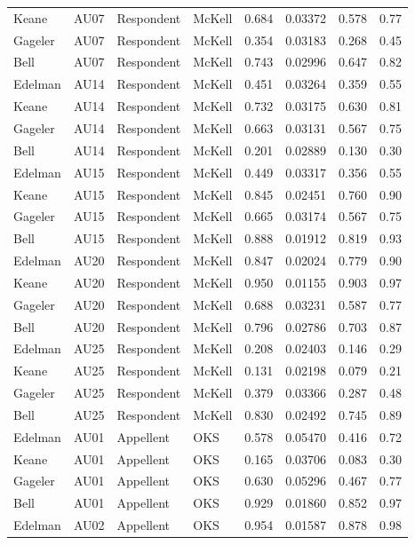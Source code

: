 \documentclass{monashthesis}
\begin{document}
\begin{center}
\begin{longtable}{llllllll}
Keane & AU07 & Respondent & McKell & 0.684 & 0.03372 & 0.578 & 0.77 \\
Gageler & AU07 & Respondent & McKell & 0.354 & 0.03183 & 0.268 & 0.45 \\
Bell & AU07 & Respondent & McKell & 0.743 & 0.02996 & 0.647 & 0.82 \\
Edelman & AU14 & Respondent & McKell & 0.451 & 0.03264 & 0.359 & 0.55 \\
Keane & AU14 & Respondent & McKell & 0.732 & 0.03175 & 0.630 & 0.81 \\
Gageler & AU14 & Respondent & McKell & 0.663 & 0.03131 & 0.567 & 0.75 \\
Bell & AU14 & Respondent & McKell & 0.201 & 0.02889 & 0.130 & 0.30 \\
Edelman & AU15 & Respondent & McKell & 0.449 & 0.03317 & 0.356 & 0.55 \\
Keane & AU15 & Respondent & McKell & 0.845 & 0.02451 & 0.760 & 0.90 \\
Gageler & AU15 & Respondent & McKell & 0.665 & 0.03174 & 0.567 & 0.75 \\
Bell & AU15 & Respondent & McKell & 0.888 & 0.01912 & 0.819 & 0.93 \\
Edelman & AU20 & Respondent & McKell & 0.847 & 0.02024 & 0.779 & 0.90 \\
Keane & AU20 & Respondent & McKell & 0.950 & 0.01155 & 0.903 & 0.97 \\
Gageler & AU20 & Respondent & McKell & 0.688 & 0.03231 & 0.587 & 0.77 \\
Bell & AU20 & Respondent & McKell & 0.796 & 0.02786 & 0.703 & 0.87 \\
Edelman & AU25 & Respondent & McKell & 0.208 & 0.02403 & 0.146 & 0.29 \\
Keane & AU25 & Respondent & McKell & 0.131 & 0.02198 & 0.079 & 0.21 \\
Gageler & AU25 & Respondent & McKell & 0.379 & 0.03366 & 0.287 & 0.48 \\
Bell & AU25 & Respondent & McKell & 0.830 & 0.02492 & 0.745 & 0.89 \\
Edelman & AU01 & Appellent & OKS & 0.578 & 0.05470 & 0.416 & 0.72 \\
Keane & AU01 & Appellent & OKS & 0.165 & 0.03706 & 0.083 & 0.30 \\
Gageler & AU01 & Appellent & OKS & 0.630 & 0.05296 & 0.467 & 0.77 \\
Bell & AU01 & Appellent & OKS & 0.929 & 0.01860 & 0.852 & 0.97 \\
Edelman & AU02 & Appellent & OKS & 0.954 & 0.01587 & 0.878 & 0.98 \\

\end{longtable}
\end{center}
\end{document}

